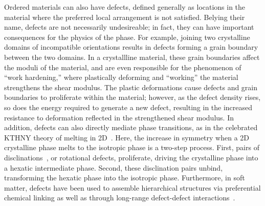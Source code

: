 Ordered materials can also have defects, defined generally as locations in the material where the preferred local arrangement is not satisfied.
Belying their name, defects are not necessarily undesireable; in fact, they can have important consequences for the physics of the phase.
For example, joining two crystalline domains of incompatible orientations results in defects forming a grain boundary between the two domains.
In a crystallline material, these grain boundaries affect the moduli of the material, and are even responsible for the phenomenon of ``work hardening,'' where plastically deforming and ``working'' the material strengthens the shear modulus.
The plastic deformations cause defects and grain boundaries to proliferate within the material; however, as the defect density rises, so does the energy required to generate a new defect, resulting in the increased resistance to deformation reflected in the strengthened shear modulus.
In addition, defects can also directly mediate phase transitions, as in the celebrated KTHNY theory of melting in 2D~\cite{RN161,RN163}.
Here, the increase in symmetry when a 2D crystalline phase melts to the isotropic phase is a two-step process.
First, pairs of disclinations~\cite{RN61,RN203}, or rotational defects, proliferate, driving the crystalline phase into a hexatic intermediate phase.
Second, these disclination pairs unbind, transforming the hexatic phase into the isotropic phase.
Furthermore, in soft matter, defects have been used to assemble hierarchical structures via preferential chemical linking as well as through long-range defect-defect interactions~\cite{RN43,RN50,RN150,RN157}.

